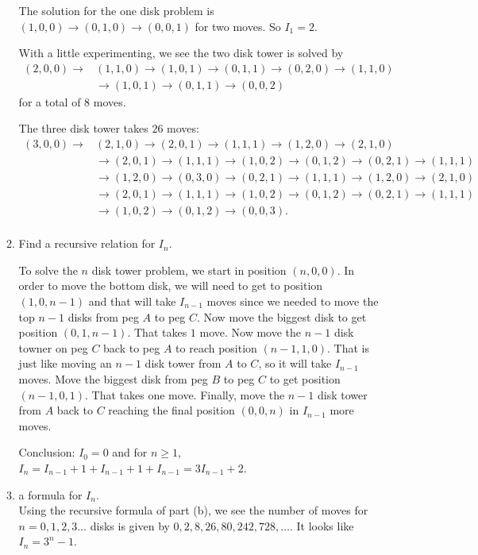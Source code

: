 \documentclass[11pt]{amsart}
\begin{document}
\begin{enumerate}
\begin{enumerate}
{The solution for the one disk problem is $(1,0,0)\to(0,1,0)\to(0,0,1)$ for two moves. So $I_{1}= 2$.

With a little experimenting, we see the two disk tower is solved  by
\begin{align*}
(2,0,0) \to & (1,1,0) \to (1,0,1) \to (0,1,1)\to (0,2,0) \to (1,1,0)\\[3pt]  
&\to (1,0,1) \to (0,1,1)\to (0,0,2)
\end{align*}
for a total of $8$ moves.

The three disk tower takes $26$ moves:
\begin{align*}
(3,0,0) \to & (2,1,0) \to (2,0,1) \to (1,1,1) \to (1,2,0) \to (2,1,0)\\[3pt]
& \to (2,0,1) \to (1,1,1) \to (1,0,2) \to (0,1,2) \to (0,2,1) \to (1,1,1)\\[3pt]
& \to  (1,2,0) \to (0,3,0) \to (0,2,1) \to (1,1,1) \to (1,2,0) \to (2,1,0)\\[3pt]
& \to (2,0,1) \to (1,1,1) \to (1,0,2) \to (0,1,2) \to (0,2,1) \to (1,1,1) \\[3pt]\
& \to (1,0,2) \to (0,1,2) \to (0,0,3).\\[3pt]
\end{align*}
}
 
\item Find a recursive relation for $I_n$.\\[3pt]
{\color{blue}
To solve the $n$ disk tower problem, we start in position $(n,0,0)$. In order to move the bottom disk,
we will need to get to position $(1,0,n-1)$ and that will take $I_{n-1}$ moves since we needed to move the top $n-1$ disks from peg $A$ to peg $C$. Now move the biggest disk to get position $(0,1,n-1)$. That takes $1$ move. Now move the $n-1$ disk towner on peg $C$ back to peg $A$ to reach position $(n-1,1,0)$. That is just like moving an $n-1$ disk tower from $A$ to $C$, so it will take $I_{n-1}$ moves.
Move the biggest disk from peg $B$ to peg $C$ to get position $(n-1,0,1)$. That takes one move. Finally, move the $n-1$ disk tower from $A$ back to $C$ reaching the final position $(0,0,n)$ in $I_{n-1}$ more moves. 

Conclusion: $I_{0}= 0$ and for $n\geq 1$, $I_{n}= I_{n-1}+ 1 + I_{n-1} + 1 + I_{n-1} = 3I_{n-1}+2$.\\[3pt]
}


\item {} a formula for $I_n$.\\[3pt]
{\color{blue}
Using the recursive formula of part (b), we see the number of moves for $n=0,1,2,3\dots$ disks
is given by $0, 2, 8, 26, 80, 242, 728, \dots$. It looks like $I_{n}= 3^{n} - 1$.\\[5pt]
}
\end{enumerate}
\end{enumerate}
\end{document}
